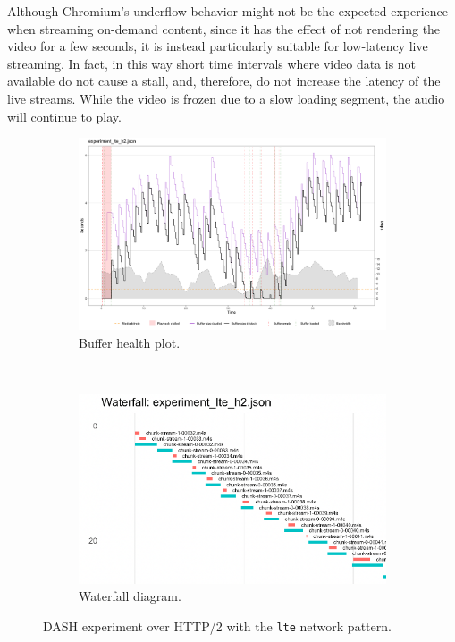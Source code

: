 Although Chromium's underflow behavior might not be the expected experience when streaming on-demand content, since it has the effect of not rendering the video for a few seconds, it is instead particularly suitable for low-latency live streaming. In fact, in this way short time intervals where video data is not available do not cause a stall, and, therefore, do not increase the latency of the live streams. While the video is frozen due to a slow loading segment, the audio will continue to play.

\begin{figure}[h]
	\centering
	
	\begin{subfigure}[t]{0.45\textwidth}
		\centering
		\includegraphics[width=\textwidth]{res/eval_nonabr_lte_h2.png}
		\caption{Buffer health plot.}
		\label{fig:eval_nonabr_lte_h2_buffer}
	\end{subfigure}%
	~ 
	\begin{subfigure}[t]{0.45\textwidth}
		\centering
		\includegraphics[width=\textwidth]{res/eval_nonabr_lte_h2_waterfall.png}
		\caption{Waterfall diagram.}
		\label{fig:eval_nonabr_lte_h2_waterfall}
	\end{subfigure}
	
	\caption{DASH experiment over HTTP/2 with the \texttt{lte} network pattern.}
	\label{fig:eval_nonabr_lte_h2}
\end{figure}

